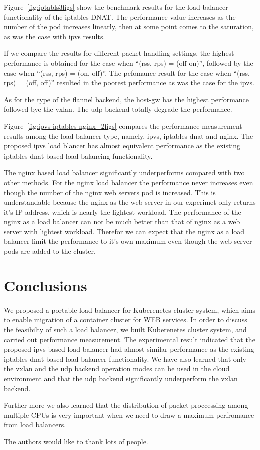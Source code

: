 Figure~\ref{fig:iptabls3figs} show the benchmark results for the load balancer 
functionality of the iptables DNAT. 
The performance value increases as the number of the pod increases linearly, 
then at some point comes to the saturation, as was the case with ipvs results.

If we compare the results for different packet handling settings, the highest performance is 
obtained for the case when \enquote{(rss, rps) = (off on)}, followed by the case when \enquote{(rss, rps) = (on, off)}. 
The pefomance result for the case when \enquote{(rss, rps) = (off, off)} resulted in the 
poorest performance as was the case for the ipvs.

As for the type of the flannel backend, the host-gw has the highest performance followed 
bye the vxlan. The udp backend totally degrade the performance.

Figure~\ref{fig:ipvs-iptables-nginx_2figs} compares the performance measurement results 
among the load balancer type, namely, ipvs, iptables dnat and nginx.
The proposed ipvs load blancer has almost equivalent performance as the existing iptables 
dnat based load balancing functionality. 

The nginx based load balancer significantly underperforms compared with two other methods.
For the nginx load balancer the performance never increases even though the number of the 
nginx web servers pod is increased.
This is understandable because the nginx as the web server in our experimet only 
returns it's IP address, which is nearly the lightest workload.
The performance of the nginx as a load balancer can not be much better than that of nginx as a web server 
with lightest workload.
Therefor we can expect that the nginx as a load balancer limit the performance to it's own maximum 
even though the web server pods are added to the cluster.

\section{Conclusions}\label{Conclusions}

We proposed a portable load balancer for Kuberenetes cluster system, 
which aims to enable migration of a container cluster for WEB services.
In order to discuss the feasibilty of such a load balancer, we built 
Kuberenetes cluster system, and carried out performance measurement.
The experimental result indicated that the proposed ipvs based load balancer
had almost similar performance as the existing iptables dnat based load balancer functionality.
We have also learned that only the vxlan and the udp backend operation modes can be used 
in the cloud environment and that the udp backend significantly underperform the vxlan backend.

Further more we also learned that the distribution of packet proccessing among multiple CPUs is very important
when we need to draw a maximum perfromance from load balancers.




\begin{acks}
  The authors would like to thank lots of people.

\end{acks}
